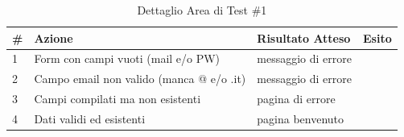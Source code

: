 \documentclass[a4paper,12pt]{article}
\begin{document}
\begin{table}[ht]
\begin{center}
\caption{Dettaglio Area di Test \#1}
\begin{tabular}{p{0.5cm} p{8cm} p{3.5cm} p{1cm}}
\rowcolor{Ash}
\hline
\# & Azione & Risultato Atteso & Esito \\ \hline
1 & Form con campi vuoti (mail e/o PW)		 &	messaggio di errore		&	\cellcolor{green}{OK}\\
2 & Campo email non valido (manca @ e/o .it)	 &     messaggio di errore		&	\cellcolor{green}{OK}\\
3 & Campi compilati ma non esistenti		 &	pagina di errore	        &	\cellcolor{green}{OK}\\
4 & Dati validi ed esistenti				 &	pagina benvenuto		&	\cellcolor{green}{OK}\\ \hline
\end{tabular}
\end{center}
\end{table}
\end{document}
